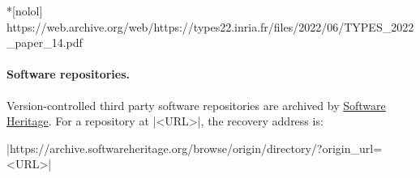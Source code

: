 \begin{center}
\begin{minipage}{\textwidth}
\begin{cmdlisting}*[nolol]
https://web.archive.org/web/https://types22.inria.fr/files/2022/06/TYPES_2022_paper_14.pdf
\end{cmdlisting}
\end{minipage}
\end{center}

\paragraph*{Software repositories.}
Version-controlled third party software repositories are archived by \href{https://softwareheritage.org/}{Software Heritage}.
For a repository at \pr|<URL>|, the recovery address is: %
\begin{center}
\pr|https://archive.softwareheritage.org/browse/origin/directory/?origin_url=<URL>|
\end{center}
